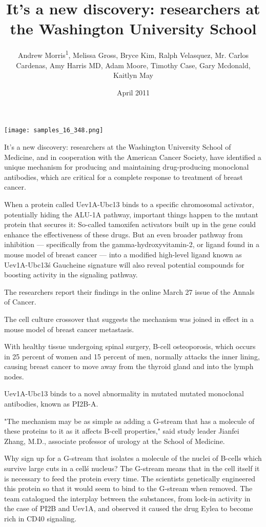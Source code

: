 \documentclass{article}
\title{It’s a new discovery: researchers at the Washington University School}
\author{Andrew Morris\textsuperscript{1},  Melissa Gross,  Bryce Kim,  Ralph Velasquez,  Mr. Carlos Cardenas,  Amy Harris MD,  Adam Moore,  Timothy Case,  Gary Mcdonald,  Kaitlyn May}
\affil{\textsuperscript{1}Hofstra Northwell School of Medicine}
\date{April 2011}
\begin{document}
\maketitle

\begin{center}
\begin{minipage}{0.75\linewidth}
\texttt{[image: samples\_16\_348.png]}
\end{minipage}
\end{center}

It’s a new discovery: researchers at the Washington University School of Medicine, and in cooperation with the American Cancer Society, have identified a unique mechanism for producing and maintaining drug-producing monoclonal antibodies, which are critical for a complete response to treatment of breast cancer.

When a protein called Uev1A-Ubc13 binds to a specific chromosomal activator, potentially hiding the ALU-1A pathway, important things happen to the mutant protein that secures it: So-called tamoxifen activators built up in the gene could enhance the effectiveness of these drugs. But an even broader pathway from inhibition — specifically from the gamma-hydroxyvitamin-2, or ligand found in a mouse model of breast cancer — into a modified high-level ligand known as Uev1A-Ubc13\'s Gaucheine signature will also reveal potential compounds for boosting activity in the signaling pathway.

The researchers report their findings in the online March 27 issue of the Annals of Cancer.

The cell culture crossover that suggests the mechanism was joined in effect in a mouse model of breast cancer metastasis.

With healthy tissue undergoing spinal surgery, B-cell osteoporosis, which occurs in 25 percent of women and 15 percent of men, normally attacks the inner lining, causing breast cancer to move away from the thyroid gland and into the lymph nodes.

Uev1A-Ubc13 binds to a novel abnormality in mutated mutated monoclonal antibodies, known as PI2B-A.

"The mechanism may be as simple as adding a G-stream that has a molecule of these proteins to it as it affects B-cell properties," said study leader Jianfei Zhang, M.D., associate professor of urology at the School of Medicine.

Why sign up for a G-stream that isolates a molecule of the nuclei of B-cells which survive large cuts in a cell\'s nucleus? The G-stream means that in the cell itself it is necessary to feed the protein every time. The scientists genetically engineered this protein so that it would seem to bind to the G-stream when removed. The team catalogued the interplay between the substances, from lock-in activity in the case of PI2B and Uev1A, and observed it caused the drug Eylea to become rich in CD40 signaling.
\end{document}
